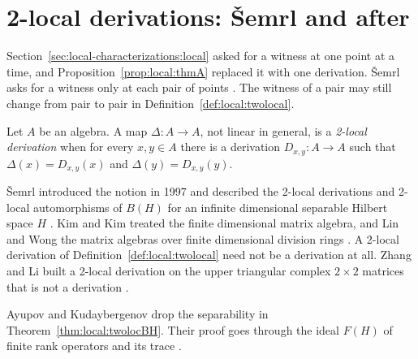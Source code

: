\section{2-local derivations: \v{S}emrl and after}\label{sec:local-characterizations:two-local}

Section~\ref{sec:local-characterizations:local} asked for a witness at one
point at a time, and Proposition~\ref{prop:local:thmA} replaced it with one
derivation. \v{S}emrl asks for a witness only at each pair of points
\cite[p.~15]{AyupovKudaybergenov2012}. The witness of a pair may still
change from pair to pair in Definition~\ref{def:local:twolocal}.

\begin{definition}\label{def:local:twolocal}
Let $A$ be an algebra. A map $\Delta\colon A\to A$, not linear in general,
is a \emph{2-local derivation} when for every $x,y\in A$ there is a
derivation $D_{x,y}\colon A\to A$ such that $\Delta(x)=D_{x,y}(x)$ and
$\Delta(y)=D_{x,y}(y)$.
\end{definition}

\v{S}emrl introduced the notion in 1997 and described the 2-local
derivations and 2-local automorphisms of $B(H)$ for an infinite dimensional
separable Hilbert space $H$ \cite[p.~15]{AyupovKudaybergenov2012}. Kim and
Kim treated the finite dimensional matrix algebra, and Lin and Wong the
matrix algebras over finite dimensional division rings
\cite[p.~15]{AyupovKudaybergenov2012}. A 2-local derivation of
Definition~\ref{def:local:twolocal} need not be a derivation at all. Zhang
and Li built a 2-local derivation on the upper triangular
complex $2\times 2$ matrices that is not a derivation
\cite[p.~15]{AyupovKudaybergenov2012}.

Ayupov and Kudaybergenov drop the separability in
Theorem~\ref{thm:local:twolocBH}. Their proof goes through
the ideal $F(H)$ of finite rank operators and its trace
\cite[p.~16]{AyupovKudaybergenov2012}.

